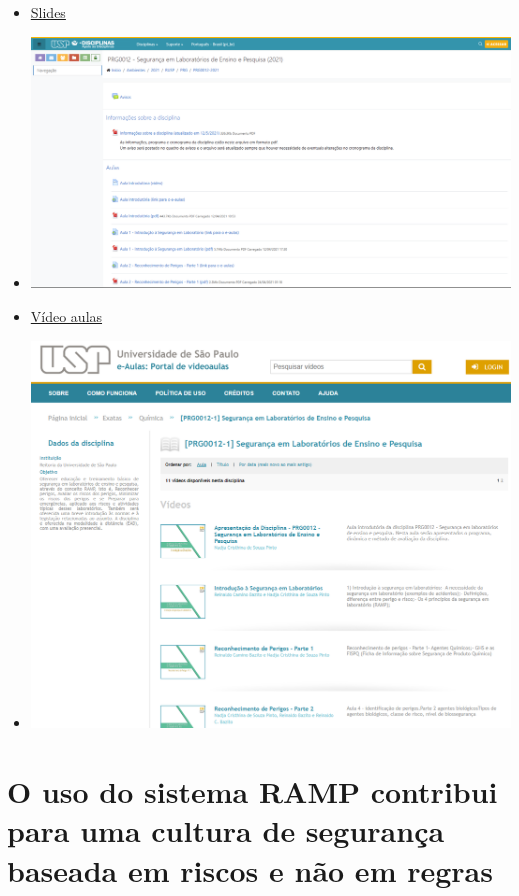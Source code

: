 \documentclass[
  letterpaper,
  DIV=11,
  numbers=noendperiod]{scrartcl}
\providecommand{\tightlist}{%
  \setlength{\itemsep}{0pt}\setlength{\parskip}{0pt}}\usepackage{longtable,booktabs,array}
\begin{document}
\begin{itemize}
\tightlist
\item
  \href{https://edisciplinas.usp.br/course/view.php?id=84617}{Slides}
\item
  \includegraphics[width=6.25in,height=\textheight,keepaspectratio]{imagens/usp01.png}
\end{itemize}

\begin{itemize}
\tightlist
\item
  \href{https://eaulas.usp.br/portal/course.action?course=24746}{Vídeo
  aulas}
\item
  \includegraphics[width=5.20833in,height=\textheight,keepaspectratio]{imagens/usp02.png}
\end{itemize}

\section{\texorpdfstring{O uso do sistema RAMP contribui para uma
\textbf{cultura de segurança} baseada em \textbf{riscos} e não em
\textbf{regras}}{O uso do sistema RAMP contribui para uma cultura de segurança baseada em riscos e não em regras}}\label{o-uso-do-sistema-ramp-contribui-para-uma-cultura-de-seguranuxe7a-baseada-em-riscos-e-nuxe3o-em-regras}
\end{document}
